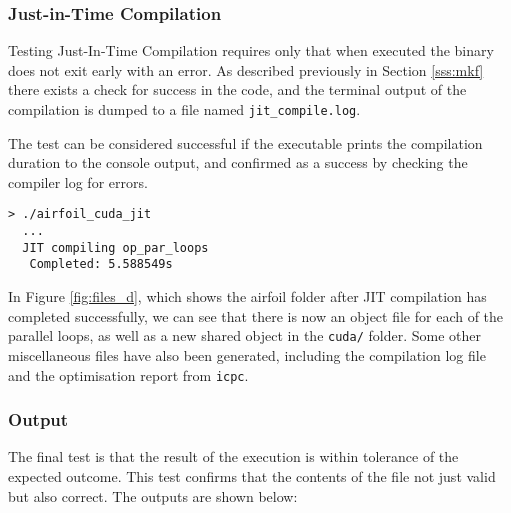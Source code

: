 \subsubsection{Just-in-Time Compilation}
Testing Just-In-Time Compilation requires only that when executed the binary does not exit early with an error. As described previously in Section \ref{sss:mkf} there exists a check for success in the code, and the terminal output of the compilation is dumped to a file named \verb|jit_compile.log|.
\par
The test can be considered successful if the executable prints the compilation duration to the console output, and confirmed as a success by checking the compiler log for errors.
\begin{verbatim}
> ./airfoil_cuda_jit
  ...
  JIT compiling op_par_loops
   Completed: 5.588549s
\end{verbatim}
In Figure \ref{fig:files_d}, which shows the airfoil folder after JIT compilation has completed successfully, we can see that there is now an object file for each of the parallel loops, as well as a new shared object in the \verb|cuda/| folder. Some other miscellaneous files have also been generated, including the compilation log file and the optimisation report from \verb|icpc|.

\subsubsection{Output}
The final test is that the result of the execution is within tolerance of the expected outcome. This test confirms that the contents of the file not just valid but also correct. The outputs are shown below:

